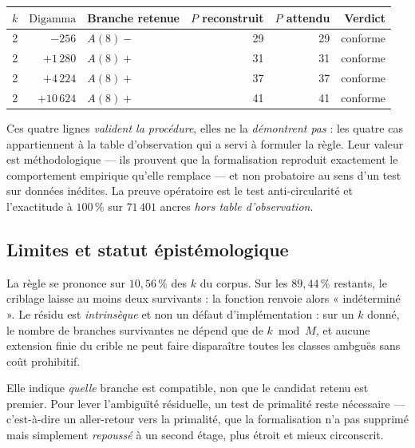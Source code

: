 \documentclass[11pt,a4paper]{article}
\begin{document}
\begin{center}
\small
\begin{tabular}{@{}r r l r r r@{}}
\toprule
\rowcolor{spectralgris}
$k$ & $\mathrm{Digamma}$ & Branche retenue & $P$ reconstruit & $P$ attendu & Verdict \\
\midrule
2 & $-256$     & $A(8)-$ & 29 & 29 & conforme \\
2 & $+1\,280$  & $A(8)+$ & 31 & 31 & conforme \\
2 & $+4\,224$  & $A(8)+$ & 37 & 37 & conforme \\
2 & $+10\,624$ & $A(8)+$ & 41 & 41 & conforme \\
\bottomrule
\end{tabular}
\end{center}

\vspace{0.3cm}
\begin{boitealerte}
Ces quatre lignes \emph{valident la procédure}, elles ne la
\emph{démontrent pas} : les quatre cas appartiennent à la table
d'observation qui a servi à formuler la règle. Leur valeur est
méthodologique --- ils prouvent que la formalisation reproduit
exactement le comportement empirique qu'elle remplace --- et non
probatoire au sens d'un test sur données inédites. La preuve
opératoire est le test anti-circularité et l'exactitude à
$100\,\%$ sur $71\,401$ ancres \emph{hors table d'observation}.
\end{boitealerte}

\subsection{Limites et statut épistémologique}

\vspace{0.3cm}
\begin{boitealerte}
La règle se prononce sur $10{,}56\,\%$ des $k$ du corpus. Sur les
$89{,}44\,\%$ restants, le criblage laisse au moins deux survivants :
la fonction renvoie alors « indéterminé ». Le résidu est
\emph{intrinsèque} et non un défaut d'implémentation : sur un
$k$ donné, le nombre de branches survivantes ne dépend que de
$k \bmod M$, et aucune extension finie du crible ne peut faire
disparaître toutes les classes ambguës sans coût prohibitif.
\end{boitealerte}

\vspace{0.3cm}
\begin{boitealerte}
Elle indique \emph{quelle} branche est compatible, non que le candidat
retenu est premier. Pour lever l'ambiguïté résiduelle, un test de
primalité reste nécessaire --- c'est-à-dire un aller-retour vers la
primalité, que la formalisation n'a pas supprimé mais simplement
\emph{repoussé} à un second étage, plus étroit et mieux circonscrit.
\end{boitealerte}
\end{document}

